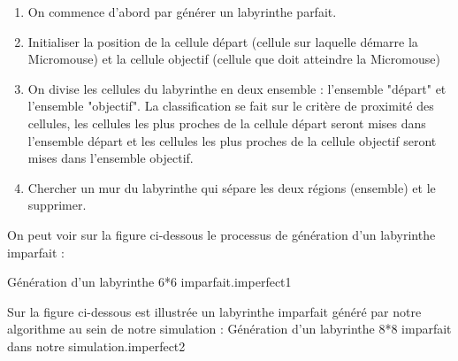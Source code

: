 \begin{enumerate}
    \item On commence d'abord par générer un labyrinthe parfait.
    \item Initialiser la position de la cellule départ (cellule sur laquelle démarre la Micromouse) et la cellule objectif (cellule que doit atteindre la Micromouse)
    \item On divise les cellules du labyrinthe en deux ensemble : l'ensemble "départ" et l'ensemble "objectif". La classification se fait sur le critère de proximité des cellules, les cellules les plus proches de la cellule départ seront mises dans l'ensemble départ et les cellules les plus proches de la cellule objectif seront mises dans l'ensemble objectif.
    \item Chercher un mur du labyrinthe qui sépare les deux régions (ensemble) et le supprimer.
    \\
    \newline
\end{enumerate}

On peut voir sur la figure ci-dessous le processus de génération d'un labyrinthe imparfait : 

{Génération d'un labyrinthe 6*6 imparfait.}{imperfect1}

Sur la figure ci-dessous est illustrée un labyrinthe imparfait généré par notre algorithme au sein de notre simulation : 
\newpage
{}
{Génération d'un labyrinthe 8*8 imparfait dans notre simulation.}{imperfect2}